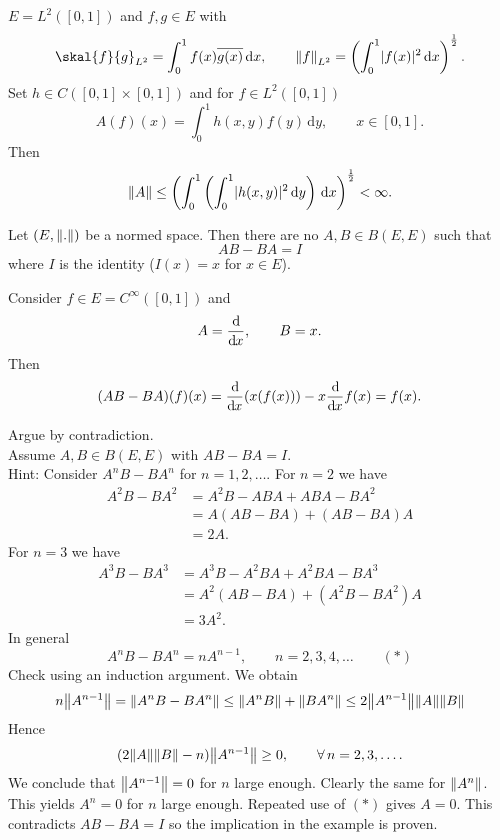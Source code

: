 
\begin{beispiel}
	$E = L^2([0,1])$ and $f,g \in E$ with
	\[
		\skal{f}{g}_{L^2} = \int_{0}^{1} f(x) \overline{g(x)} \,\mathrm{d}x, \qquad \norm{f}_{L^2} = \left( \int_{0}^{1} \abs{f(x)}^2 \,\mathrm{d}x \right)^{\frac{1}{2}}.
	\]
	Set $h \in C([0,1] \times [0,1])$ and for $f \in L^2([0,1])$
	\[
		A(f)(x) = \int_{0}^{1} h(x,y)f(y) \,\mathrm{d}y, \qquad x \in [0,1].
	\]
	Then
	\[
		\norm{A} \leq \left( \int_{0}^{1} \left( \int_{0}^{1} \abs{h(x,y)}^2 \,\mathrm{d}y \right) \,\mathrm{d}x \right)^{\frac{1}{2}} < \infty.
	\]
\end{beispiel}
\begin{beispiel}
	Let $(E, \norm{.})$ be a normed space. Then there are no $A,B \in B(E,E)$ such that
	\[
		AB - BA = I
	\]
	where $I$ is the identity ($I(x)=x$ for $x \in E$).
	\begin{bemerkung}
		Consider $ f \in E = C^{\infty}([0,1])$ and 
		\[
			A = \frac{\mathrm{d}\mkern-1.0mu }{\mathrm{d}\mkern-1.0mu x} , \qquad B=x.
		\]Then
		\[
			(AB - BA)(f)(x) = \frac{\mathrm{d}\mkern-1.0mu }{\mathrm{d}\mkern-1.0mu x} (x(f(x))) - x \frac{\mathrm{d}\mkern-1.0mu }{\mathrm{d}\mkern-1.0mu x} f(x) = f(x).
		\]
	\end{bemerkung}
	Argue by contradiction. \\
	Assume $A,B \in B(E,E)$ with $AB-BA = I$. \\
	Hint: Consider $A^nB-BA^n$ for $n = 1,2,\dots$. For $n =2$ we have
	\begin{align*}
		A^2B-BA^2 &= A^2B-ABA + ABA - BA^2 \\
		&= A(AB-BA) + (AB-BA)A \\
		&= 2A.
	\end{align*}
	For $n=3$ we have
	\begin{align*}
		A^3B-BA^3 &= A^3B-A^2BA + A^2BA - BA^3 \\
		&=A^2(AB-BA) + (A^2B-BA^2)A \\
		&= 3A^2.
	\end{align*}
	In general 
	\[
		A^nB-BA^n = nA^{n-1}, \qquad n=2,3,4,\dots \qquad (*)
	\]
	Check using an induction argument. We obtain
	\[
		n \norm{A^{n-1}} = \norm{A^nB-BA^n} \leq \norm{A^nB} + \norm{BA^n} \leq  2 \norm{A^{n-1}} \norm{A} \norm{B}
	\]
	Hence \[
		(2 \norm{A} \norm{B} -n) \norm{A^{n-1}} \geq 0, \qquad  \forall\,  n = 2,3,\dots.
	\]
	We conclude that $\norm{A^{n-1}}= 0$ for $n$ large enough. Clearly the same for $\norm{A^n}$. This yields $A^n=0$ for $n$ large enough. Repeated use of $(*)$ gives $A=0$. This contradicts $AB-BA= I$ so the implication in the example is proven.
\end{beispiel}

